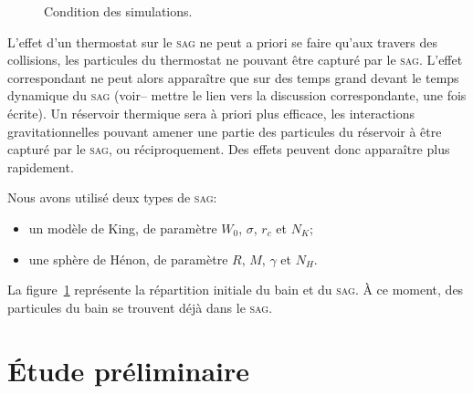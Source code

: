 	\begin{figure}[hbt]
		\begin{center}
			\caption{Condition des simulations.\label{Fig::CI::Repr}}
		\end{center}
	\end{figure}

	L'effet d'un thermostat sur le \textsc{sag} ne peut a priori se faire qu'aux travers des collisions, les
	particules du thermostat ne pouvant être capturé par le \textsc{sag}. L'effet correspondant ne peut
	alors apparaître que sur des temps grand devant le temps dynamique du \textsc{sag} (voir-- mettre le
	lien vers la discussion correspondante, une fois écrite). Un réservoir thermique sera à priori plus
	efficace, les interactions gravitationnelles pouvant amener une partie des particules du réservoir à
	être capturé par le \textsc{sag}, ou réciproquement. Des effets peuvent donc apparaître plus rapidement.

	Nous avons utilisé deux types de \textsc{sag}:
	\begin{itemize}
		\item un modèle de King, de paramètre $W_0$, $\sigma$, $r_c$ et $N_K$;
		\item une sphère de Hénon, de paramètre $R$, $M$, $\gamma$ et $N_H$.
	\end{itemize}

	La figure~\ref{Fig::CI::Repr} représente la répartition initiale du bain et du \textsc{sag}. À ce moment, des particules du bain se trouvent déjà dans le \textsc{sag}.


\section{Étude préliminaire}


